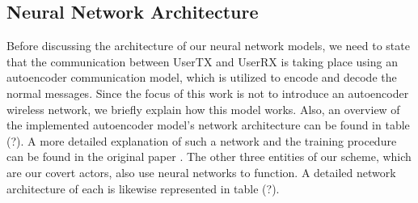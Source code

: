 \subsection{Neural Network Architecture}
Before discussing the architecture of our neural network models, we need to state that the communication between UserTX and UserRX is taking place using an autoencoder communication model, which is utilized to encode and decode the normal messages. Since the focus of this work is not to introduce an autoencoder wireless network, we briefly explain how this model works. Also, an overview of the implemented autoencoder model's network architecture can be found in table (?). A more detailed explanation of such a network and the training procedure can be found in the original paper \cite{o2017introduction}. The other three entities of our scheme, which are our covert actors, also use neural networks to function. A detailed network architecture of each is likewise represented in table (?).\\
